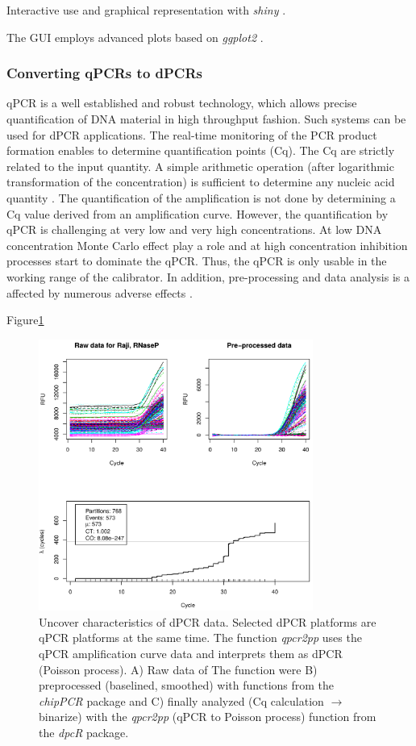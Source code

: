 \documentclass[a4,center,fleqn]{NAR}
\begin{document}
Interactive use and graphical representation with \textit{shiny} \cite{shiny}.

The GUI employs advanced plots based on \textit{ggplot2} \cite{kahle_wickham_2013}.

\subsubsection{Converting qPCRs to dPCRs}

qPCR is a well established and robust 
technology, which allows precise quantification of DNA material in high 
throughput fashion. Such systems can be used for dPCR applications. The real-time monitoring of the PCR product formation enables to determine 
quantification points (Cq). The Cq are strictly related to the input quantity. A 
simple arithmetic operation (after logarithmic transformation of the 
concentration) is sufficient to determine any nucleic acid quantity 
\cite{huggett_considerations_2014}. The quantification of the amplification is not done by determining a Cq 
value derived from an amplification curve. However, the quantification by qPCR is challenging at very 
low and very high concentrations. At low DNA concentration Monte Carlo effect 
play a role and at high concentration inhibition processes start to dominate the 
qPCR. Thus, the qPCR is only usable in the working range of the calibrator. In 
addition, pre-processing and data analysis is a affected by numerous adverse 
effects \cite{ruijter_2013, pabinger_survey_2014, spiess_impact_2015}.

Figure\ref{qpcr2pp_1}

\begin{figure}[t]
\begin{center}
\includegraphics[width=9cm]{qpcr2pp_1.png}
\end{center}
\caption{Uncover characteristics of dPCR data. 
Selected dPCR platforms are qPCR platforms at the same time. The function \textit{qpcr2pp} uses the 
qPCR amplification curve data and interprets them as dPCR (Poisson process). A) Raw data of The 
function were B) preprocessed (baselined, smoothed) with functions from the 
\textit{chipPCR} package and C) finally analyzed (Cq calculation $\rightarrow$ binarize) with the 
\textit{qpcr2pp} (qPCR to Poisson process) function from the \textit{dpcR} package.} 
\label{qpcr2pp_1}
\end{figure}
\end{document}
